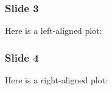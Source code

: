 \begin{frame}[fragile]
\frametitle{Slide 3}


Here is a left-aligned plot:

\end{frame}

\begin{frame}[fragile]
\frametitle{Slide 4}


Here is a right-aligned plot:

\end{frame}

